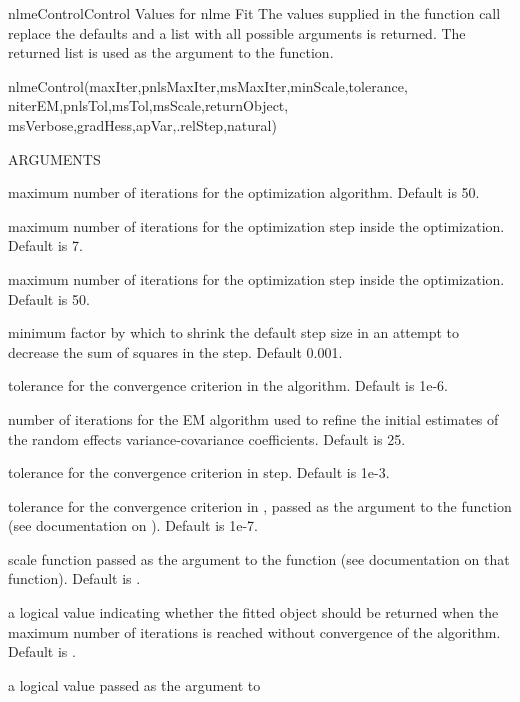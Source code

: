 \documentclass[pdftex]{article} \usepackage{url,graphicx}
\begin{document}
\begin{Helpfile}{nlmeControl}{Control Values for nlme Fit}
The values supplied in the function call replace the defaults and a
list with all possible arguments is returned. The returned list is
used as the  argument to the  function.
\begin{Example}
nlmeControl(maxIter,pnlsMaxIter,msMaxIter,minScale,tolerance,
            niterEM,pnlsTol,msTol,msScale,returnObject,
            msVerbose,gradHess,apVar,.relStep,natural)
\end{Example}
\begin{Argument}{ARGUMENTS}
\item[\Co{maxIter:}]
maximum number of iterations for the 
optimization algorithm. Default is 50.
\item[\Co{pnlsMaxIter:}]
maximum number of iterations
for the  optimization step inside the 
optimization. Default is 7.
\item[\Co{msMaxIter:}]
maximum number of iterations
for the  optimization step inside the 
optimization. Default is 50.
\item[\Co{minScale:}]
minimum factor by which to shrink the default step size
in an attempt to decrease the sum of squares in the  step.
Default 0.001.
\item[\Co{tolerance:}]
tolerance for the convergence criterion in the
 algorithm. Default is 1e-6.
\item[\Co{niterEM:}]
number of iterations for the EM algorithm used to refine
the initial estimates of the random effects variance-covariance
coefficients. Default is 25.
\item[\Co{pnlsTol:}]
tolerance for the convergence criterion in 
step. Default is 1e-3.
\item[\Co{msTol:}]
tolerance for the convergence criterion in ,
passed as the  argument to the function (see
documentation on ). Default is 1e-7. 
\item[\Co{msScale:}]
scale function passed as the  argument to
the  function (see documentation on that function). Default
is .
\item[\Co{returnObject:}]
a logical value indicating whether the fitted
object should be returned when the maximum number of iterations is
reached without convergence of the algorithm. Default is
.
\item[\Co{msVerbose:}]
a logical value passed as the  argument to

\end{Argument}
\end{Helpfile}
\end{document}
